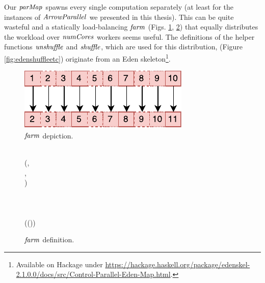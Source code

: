\documentclass[paper=A4,twoside=true,openright,parskip=full,chapterprefix=true,headings=normal,bibliography=totoc,listof=totoc,titlepage=on,captions=tableabove,draft=false,british]{scrreprt}%
\begin{document}
Our \ensuremath{\Varid{parMap}} spawns every single computation separately (at least for
the instances of \ensuremath{\Conid{ArrowParallel}} we presented in this thesis). This can
be quite wasteful and a statically load-balancing \ensuremath{\Varid{farm}} (Figs. \ref{fig:farmImg},
\ref{fig:farm}) that equally distributes the workload
over \ensuremath{\Varid{numCores}} workers seems useful. The definitions of the helper
functions \ensuremath{\Varid{unshuffle}} and \ensuremath{\Varid{shuffle}}, which are used for this
distribution, (Figure \ref{fig:edenshuffleetc}) originate from an Eden
skeleton\footnote{Available on Hackage under
  \url{https://hackage.haskell.org/package/edenskel-2.1.0.0/docs/src/Control-Parallel-Eden-Map.html}.}.

\begin{figure}[h]
\centering
\includegraphics{src/img/farmImg.pdf}
\caption{\ensuremath{\Varid{farm}} depiction.\label{fig:farmImg}}
\end{figure}

\begin{figure}[h]
\centering
\begin{hscode}\SaveRestoreHook
{}%
%
%
\>[B]{}\;\mathrel{=}\<[E]%
\\[\blanklineskip]%
\>[B]{}\mathbin{::}(\;\;\;\;,{}\<[E]%
\\
\>[B]{}\<[5]%
\>[5]{}\;\;,{}\<[E]%
\\
\>[B]{}\<[5]%
\>[5]{}\;)\Rightarrow {}\<[E]%
\\
\>[B]{}\<[5]%
\>[5]{}\to {}\to {}\;\;\to {}\<[E]%
\\
\>[B]{}\;\;\;\mathrel{=}{}\<[E]%
\\
\>[B]{}\<[5]%
\>[5]{}\;\mathbin{>\!\!>\!\!>}{}\<[E]%
\\
\>[B]{}\<[5]%
\>[5]{}\;\;(\;(\;))\mathbin{>\!\!>\!\!>}{}\<[E]%
\\
\>[B]{}\<[5]%
\>[5]{}\<[E]%
\ColumnHook
\end{hscode}\resethooks
\caption{\ensuremath{\Varid{farm}} definition.}\label{fig:farm}\end{figure}
\end{document}

